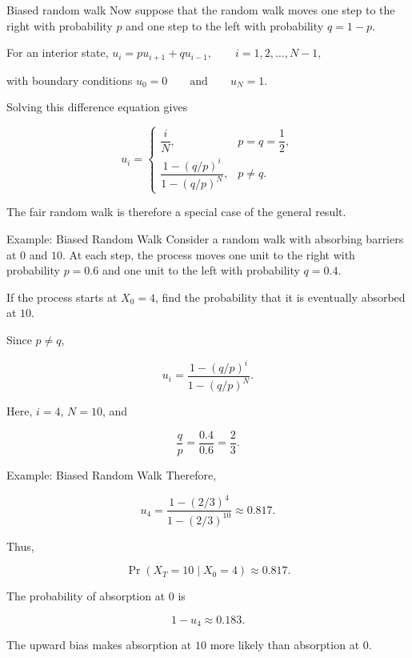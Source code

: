 \documentclass[
  ignorenonframetext,
  aspectratio=169,
]{beamer}
\begin{document}
\begin{frame}{Biased random walk}
\protect{}\label{biased-random-walk}
Now suppose that the random walk moves one step to the right with
probability \(p\) and one step to the left with probability \(q=1-p\).

For an interior state,
\(u_i=pu_{i+1}+qu_{i-1}, \qquad i=1,2,\ldots,N-1,\)

with boundary conditions \(u_0=0 \qquad\text{and}\qquad u_N=1\).

Solving this difference equation gives

\[
\boxed{
u_i=
\begin{cases}
\dfrac{i}{N}, & p=q=\dfrac12,\\[6pt]
\dfrac{1-(q/p)^i}{1-(q/p)^N}, & p\ne q.
\end{cases}}
\]

The fair random walk is therefore a special case of the general result.
\end{frame}

\begin{frame}{Example: Biased Random Walk}
\protect{}\label{example-biased-random-walk}
Consider a random walk with absorbing barriers at \(0\) and \(10\). At
each step, the process moves one unit to the right with probability
\(p=0.6\) and one unit to the left with probability \(q=0.4\).

If the process starts at \(X_0=4\), find the probability that it is
eventually absorbed at \(10\).

Since \(p\ne q\),

\[
u_i=\frac{1-(q/p)^i}{1-(q/p)^N}.
\]

Here, \(i=4\), \(N=10\), and

\[
\frac{q}{p}=\frac{0.4}{0.6}=\frac{2}{3}.
\]
\end{frame}

\begin{frame}{Example: Biased Random Walk}
\protect{}\label{example-biased-random-walk-1}
Therefore,

\[
u_4=
\frac{1-(2/3)^4}{1-(2/3)^{10}}
\approx0.817.
\]

Thus,

\[
\boxed{\Pr(X_T=10\mid X_0=4)\approx0.817}.
\]

The probability of absorption at \(0\) is

\[
1-u_4\approx0.183.
\]

The upward bias makes absorption at \(10\) more likely than absorption
at \(0\).
\end{frame}
\end{document}
